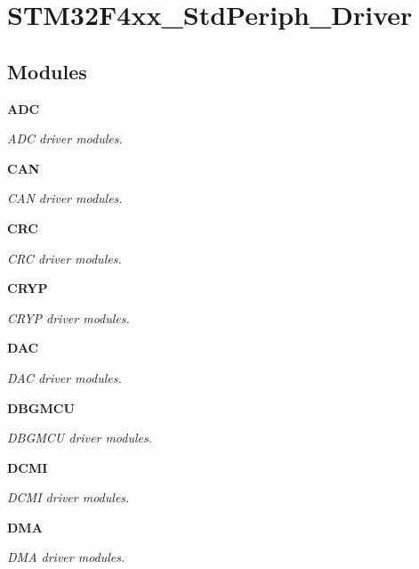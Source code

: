 \section{S\+T\+M32\+F4xx\+\_\+\+Std\+Periph\+\_\+\+Driver}
\label{group__STM32F4xx__StdPeriph__Driver}
\subsection*{Modules}
\begin{DoxyCompactItemize}
\item 
\textbf{ A\+DC}
\begin{DoxyCompactList}\small\item\em A\+DC driver modules. \end{DoxyCompactList}\item 
\textbf{ C\+AN}
\begin{DoxyCompactList}\small\item\em C\+AN driver modules. \end{DoxyCompactList}\item 
\textbf{ C\+RC}
\begin{DoxyCompactList}\small\item\em C\+RC driver modules. \end{DoxyCompactList}\item 
\textbf{ C\+R\+YP}
\begin{DoxyCompactList}\small\item\em C\+R\+YP driver modules. \end{DoxyCompactList}\item 
\textbf{ D\+AC}
\begin{DoxyCompactList}\small\item\em D\+AC driver modules. \end{DoxyCompactList}\item 
\textbf{ D\+B\+G\+M\+CU}
\begin{DoxyCompactList}\small\item\em D\+B\+G\+M\+CU driver modules. \end{DoxyCompactList}\item 
\textbf{ D\+C\+MI}
\begin{DoxyCompactList}\small\item\em D\+C\+MI driver modules. \end{DoxyCompactList}\item 
\textbf{ D\+MA}
\begin{DoxyCompactList}\small\item\em D\+MA driver modules. \end{DoxyCompactList}\item 

\end{DoxyCompactItemize}
